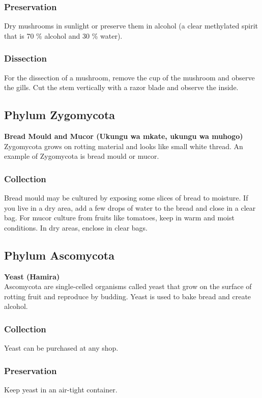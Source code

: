 \subsubsection*{Preservation} 
Dry mushrooms in sunlight or preserve them in alcohol (a clear methylated spirit that is 70 \% alcohol and 30 \% water).

\subsubsection*{Dissection}
For the dissection of a mushroom, remove the cup of the mushroom and observe the gills. Cut the stem vertically with a razor blade and observe the inside.

\subsection{Phylum Zygomycota}

\textbf{Bread Mould and Mucor (Ukungu wa mkate, ukungu wa muhogo)}\\
Zygomycota grows on rotting material and looks like small white thread. An example of Zygomycota is bread mould or mucor.

\subsubsection{Collection}

Bread mould may be cultured by exposing some slices of bread to moisture. If you live in a dry area, add a few drops of water to the bread and close in a clear bag.
For mucor culture from fruits like tomatoes, keep in warm and moist conditions. In dry areas, enclose in clear bags. 

\subsection{Phylum Ascomycota}

\textbf{Yeast (Hamira)}\\
Ascomycota are single-celled organisms called yeast that grow on the surface of rotting fruit and reproduce by budding. Yeast is used to bake bread and create alcohol.

\subsubsection{Collection}
Yeast can be purchased at any shop.

\subsubsection*{Preservation} 
Keep yeast in an air-tight container.

